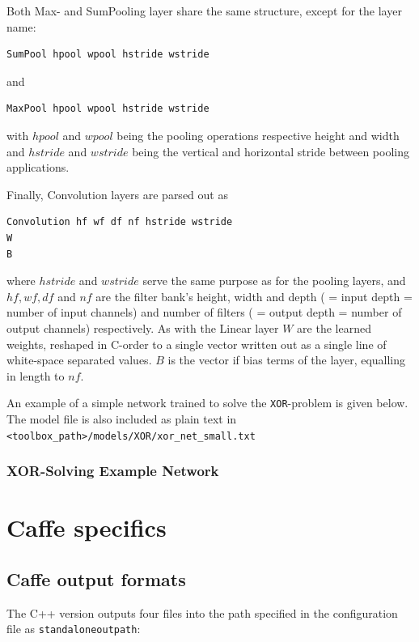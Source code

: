 \documentclass[a4wide]{article}
\begin{document}
		Both Max- and SumPooling layer share the same structure, except for the layer name:
		\begin{verbatim}
SumPool hpool wpool hstride wstride
		\end{verbatim}

		and
		\begin{verbatim}
MaxPool hpool wpool hstride wstride
		\end{verbatim}
        with $hpool$ and $wpool$ being the pooling operations respective height and width and $hstride$ and $wstride$ being the vertical and horizontal stride between pooling applications.

        Finally, Convolution layers are parsed out as
        \begin{verbatim}
Convolution hf wf df nf hstride wstride
W
B
        \end{verbatim}
        where $hstride$ and $wstride$ serve the same purpose as for the pooling layers, and $hf, wf, df$ and $nf$ are the filter bank's height, width and depth ( = input depth = number of input channels) and number of filters ( = output depth = number of output channels) respectively. As with the Linear layer $W$ are the learned weights, reshaped in C-order to a single vector written out as a single line of white-space separated values. $B$ is the vector if bias terms of the layer, equalling in length to $nf$.

        An example of a simple network trained to solve the \texttt{XOR}-problem is given below. The model file is also included as plain text in \texttt{<toolbox\_path>/models/XOR/xor\_net\_small.txt}

\subsubsection*{XOR-Solving Example Network}


\section{Caffe specifics}
\label{sec:caffe_specifics}

\subsection*{Caffe output formats}


The C++ version outputs four files into the path specified in the configuration file as \texttt{standalone\textunderscore outpath}:
\end{document}
